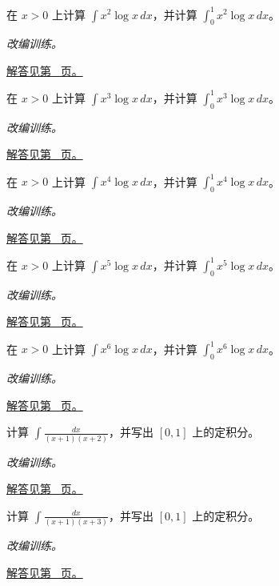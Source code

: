 \documentclass[UTF8,12pt,a4paper,fontset=fandol]{ctexart}
\begin{document}
\begin{example}[幂函数乘对数]\label{ex:c13q8}
在 $x>0$ 上计算 $\displaystyle\int x^{2}\log x\,dx$，并计算 $\displaystyle\int_0^1x^{2}\log x\,dx$。
\par\textit{改编训练。}\par\hyperref[ans:c13q8]{解答见第~\pageref{ans:c13q8} 页。}
\end{example}
\begin{example}[幂函数乘对数]\label{ex:c13q9}
在 $x>0$ 上计算 $\displaystyle\int x^{3}\log x\,dx$，并计算 $\displaystyle\int_0^1x^{3}\log x\,dx$。
\par\textit{改编训练。}\par\hyperref[ans:c13q9]{解答见第~\pageref{ans:c13q9} 页。}
\end{example}
\begin{example}[幂函数乘对数]\label{ex:c13q10}
在 $x>0$ 上计算 $\displaystyle\int x^{4}\log x\,dx$，并计算 $\displaystyle\int_0^1x^{4}\log x\,dx$。
\par\textit{改编训练。}\par\hyperref[ans:c13q10]{解答见第~\pageref{ans:c13q10} 页。}
\end{example}
\begin{example}[幂函数乘对数]\label{ex:c13q11}
在 $x>0$ 上计算 $\displaystyle\int x^{5}\log x\,dx$，并计算 $\displaystyle\int_0^1x^{5}\log x\,dx$。
\par\textit{改编训练。}\par\hyperref[ans:c13q11]{解答见第~\pageref{ans:c13q11} 页。}
\end{example}
\begin{example}[幂函数乘对数]\label{ex:c13q12}
在 $x>0$ 上计算 $\displaystyle\int x^{6}\log x\,dx$，并计算 $\displaystyle\int_0^1x^{6}\log x\,dx$。
\par\textit{改编训练。}\par\hyperref[ans:c13q12]{解答见第~\pageref{ans:c13q12} 页。}
\end{example}
\begin{example}[互异一次因子的部分分式]\label{ex:c13q13}
计算 $\displaystyle\int\frac{dx}{(x+1)(x+2)}$，并写出 $[0,1]$ 上的定积分。
\par\textit{改编训练。}\par\hyperref[ans:c13q13]{解答见第~\pageref{ans:c13q13} 页。}
\end{example}
\begin{example}[互异一次因子的部分分式]\label{ex:c13q14}
计算 $\displaystyle\int\frac{dx}{(x+1)(x+3)}$，并写出 $[0,1]$ 上的定积分。
\par\textit{改编训练。}\par\hyperref[ans:c13q14]{解答见第~\pageref{ans:c13q14} 页。}
\end{example}
\end{document}
